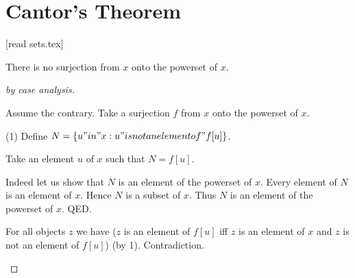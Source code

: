 \documentclass{article}
\begin{document}
  \section{Cantor's Theorem}

  \begin{forthel}

    [read sets.tex]

    \begin{theorem}[Cantor]
      There is no surjection from $x$ onto the powerset of $x$.
    \end{theorem}

    \begin{proof}[by case analysis]
      \begin{case}[$x$ is empty]
      \end{case}

      \begin{case}[$x$ is nonempty]
        Assume the contrary. Take a surjection $f$ from $x$ onto the powerset of
        $x$.

        (1) Define $N = \{u "in" x : u "is not an element of" f[u]\}$.

        Take an element $u$ of $x$ such that $N = f[u]$.

        Indeed let us show that $N$ is an element of the powerset of $x$.
          Every element of $N$ is an element of $x$. Hence $N$ is a subset of
          $x$. Thus $N$ is an element of the powerset of $x$.
        QED.

        For all objects $z$ we have ($z$ is an element of $f[u]$ iff $z$ is an
        element of $x$ and $z$ is not an element of $f[u]$) (by 1).
        Contradiction.
      \end{case}
    \end{proof}
  \end{forthel}
\end{document}

